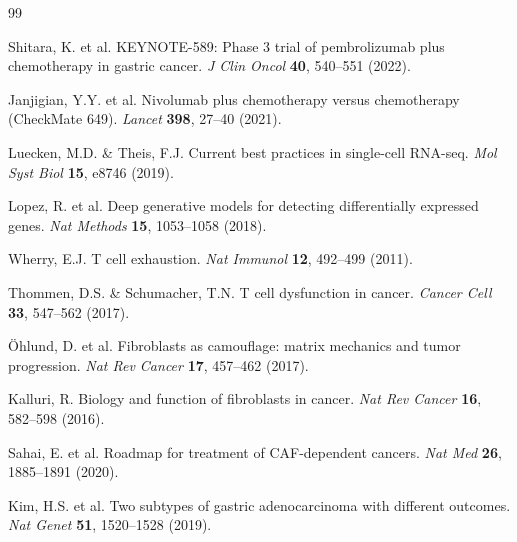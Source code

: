 \documentclass[12pt,twoside]{article}
\begin{document}
\begin{thebibliography}{99}

 Shitara, K. et al. KEYNOTE-589: Phase 3 trial of pembrolizumab plus chemotherapy in gastric cancer. \textit{J Clin Oncol} \textbf{40}, 540--551 (2022).

 Janjigian, Y.Y. et al. Nivolumab plus chemotherapy versus chemotherapy (CheckMate 649). \textit{Lancet} \textbf{398}, 27--40 (2021).

 Luecken, M.D. \& Theis, F.J. Current best practices in single-cell RNA-seq. \textit{Mol Syst Biol} \textbf{15}, e8746 (2019).

 Lopez, R. et al. Deep generative models for detecting differentially expressed genes. \textit{Nat Methods} \textbf{15}, 1053--1058 (2018).

 Wherry, E.J. T cell exhaustion. \textit{Nat Immunol} \textbf{12}, 492--499 (2011).

 Thommen, D.S. \& Schumacher, T.N. T cell dysfunction in cancer. \textit{Cancer Cell} \textbf{33}, 547--562 (2017).

 Öhlund, D. et al. Fibroblasts as camouflage: matrix mechanics and tumor progression. \textit{Nat Rev Cancer} \textbf{17}, 457--462 (2017).

 Kalluri, R. Biology and function of fibroblasts in cancer. \textit{Nat Rev Cancer} \textbf{16}, 582--598 (2016).

 Sahai, E. et al. Roadmap for treatment of CAF-dependent cancers. \textit{Nat Med} \textbf{26}, 1885--1891 (2020).

 Kim, H.S. et al. Two subtypes of gastric adenocarcinoma with different outcomes. \textit{Nat Genet} \textbf{51}, 1520--1528 (2019).

\end{thebibliography}
\end{document}
